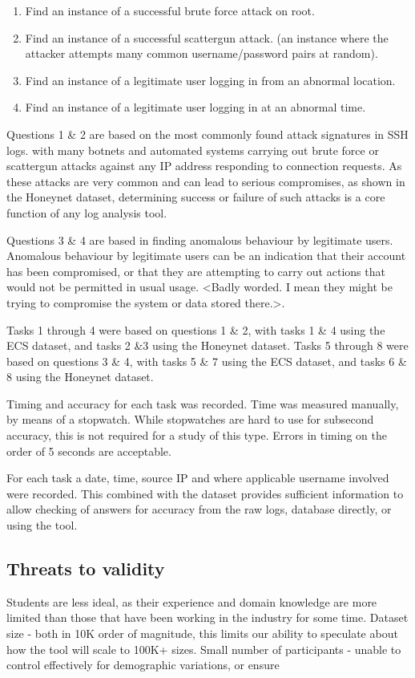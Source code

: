 \begin{enumerate}
\item{Find an instance of a successful brute force attack on root.}
\item{Find an instance of a successful scattergun attack.
(an instance where the attacker attempts many common username/password pairs at random).}
\item{Find an instance of a legitimate user logging in from an abnormal location.}
\item{Find an instance of a legitimate user logging in at an abnormal time.}
\end{enumerate}

Questions 1 \& 2 are based on the most commonly found attack signatures in SSH logs. with many botnets and automated systems carrying out brute force or scattergun attacks against any IP address responding to connection requests. As these attacks are very common and can lead to serious compromises, as shown in the Honeynet dataset, determining success or failure of such attacks is a core function of any log analysis tool. 

Questions 3 \& 4 are based in finding anomalous behaviour by legitimate users. Anomalous behaviour by legitimate users can be an indication that their account has been compromised, or that they are attempting to carry out actions that would not be permitted in usual usage. <Badly worded. I mean they might be trying to compromise the system or data stored there.>. 

Tasks 1 through 4 were based on questions 1 \& 2, with tasks 1 \& 4 using the ECS dataset, and tasks 2 \&3 using the Honeynet dataset.
Tasks 5 through 8 were based on questions 3 \& 4, with tasks 5 \& 7 using the ECS dataset, and tasks 6 \& 8 using  the Honeynet dataset. 

Timing and accuracy for each task was recorded. 
Time was measured manually, by means of a stopwatch. While stopwatches are hard to use for subsecond accuracy, this is not required for a study of this type. Errors in timing on the order of 5 seconds are acceptable.

For each task a date, time, source IP and where applicable username involved were recorded. This combined with the dataset provides sufficient information to allow checking of answers for accuracy from the raw logs, database directly, or using the tool. 

\subsection{Threats to validity}
 Students are less ideal, as their experience and domain knowledge are more limited than those that have been working in the industry for some time.
Dataset size - both in 10K order of magnitude, this limits our ability to speculate about how the tool will scale to 100K+ sizes. 
Small number of participants - unable to control effectively for demographic variations, or ensure 

